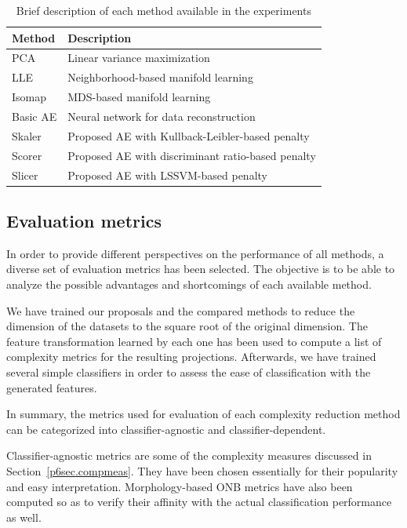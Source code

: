 \begin{table}[ht]
  \centering
  \caption{\label{p6tbl.methods}Brief description of each method available in the experiments}
  \begin{tabular}{ll}
    \toprule
    Method              & Description                                       \\
    \midrule
    PCA\cite{PCABook}   & Linear variance maximization                      \\
    LLE\cite{LLE}       & Neighborhood-based manifold learning              \\
    Isomap\cite{Isomap} & MDS-based manifold learning                       \\
    Basic AE\cite{AEs}  & Neural network for data reconstruction            \\
    Skaler              & Proposed AE with Kullback-Leibler-based penalty   \\
    Scorer              & Proposed AE with discriminant ratio-based penalty \\
    Slicer              & Proposed AE with LSSVM-based penalty              \\
    \bottomrule
  \end{tabular}
\end{table}

\subsection{Evaluation metrics}

In order to provide different perspectives on the performance of all methods, a diverse set of evaluation metrics has been selected. The objective is to be able to analyze the possible advantages and shortcomings of each available method.

We have trained our proposals and the compared methods to reduce the dimension of the datasets to the square root of the original dimension. The feature transformation learned by each one has been used to compute a list of complexity metrics for the resulting projections. Afterwards, we have trained several simple classifiers in order to assess the ease of classification with the generated features.

In summary, the metrics used for evaluation of each complexity reduction method can be categorized into classifier-agnostic and classifier-dependent.

Classifier-agnostic metrics are some of the complexity measures discussed in Section~\ref{p6sec.compmeas}. They have been chosen essentially for their popularity and easy interpretation. Morphology-based ONB metrics have also been computed so as to verify their affinity with the actual classification performance as well. %

